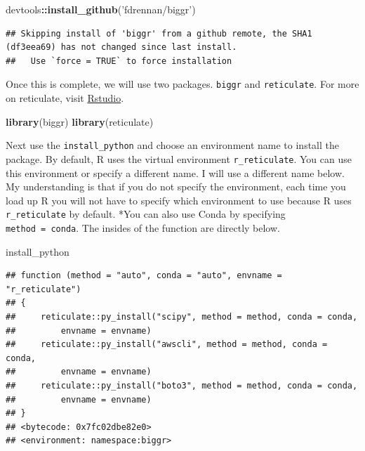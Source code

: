 \documentclass[]{book}
\newenvironment{Shaded}{\begin{snugshade}}{\end{snugshade}}
\newcommand{\KeywordTok}[1]{\textcolor[rgb]{0.13,0.29,0.53}{\textbf{#1}}}
\newcommand{\NormalTok}[1]{#1}
\newcommand{\OperatorTok}[1]{\textcolor[rgb]{0.81,0.36,0.00}{\textbf{#1}}}
\newcommand{\StringTok}[1]{\textcolor[rgb]{0.31,0.60,0.02}{#1}}
\begin{document}
\begin{Shaded}
\begin{Highlighting}[]
\NormalTok{devtools}\OperatorTok{::}\KeywordTok{install_github}\NormalTok{(}\StringTok{'fdrennan/biggr'}\NormalTok{)}
\end{Highlighting}
\end{Shaded}

\begin{verbatim}
## Skipping install of 'biggr' from a github remote, the SHA1 (df3eea69) has not changed since last install.
##   Use `force = TRUE` to force installation
\end{verbatim}

Once this is complete, we will use two packages. \texttt{biggr} and \texttt{reticulate}. For more on reticulate, visit \href{https://rstudio.github.io/reticulate/}{Rstudio}.

\begin{Shaded}
\begin{Highlighting}[]
\KeywordTok{library}\NormalTok{(biggr)}
\KeywordTok{library}\NormalTok{(reticulate)}
\end{Highlighting}
\end{Shaded}

Next use the \texttt{install\_python} and choose an environment name to install the package. By default, R uses the virtual environment \texttt{r\_reticulate}. You can use this environment or specify a different name. I will use a different name below. My understanding is that if you do not specify the environment, each time you load up R you will not have to specify which environment to use because R uses \texttt{r\_reticulate} by default. *You can also use Conda by specifying \texttt{method\ =\ conda}. The insides of the function are directly below.

\begin{Shaded}
\begin{Highlighting}[]
\NormalTok{install_python}
\end{Highlighting}
\end{Shaded}

\begin{verbatim}
## function (method = "auto", conda = "auto", envname = "r_reticulate") 
## {
##     reticulate::py_install("scipy", method = method, conda = conda, 
##         envname = envname)
##     reticulate::py_install("awscli", method = method, conda = conda, 
##         envname = envname)
##     reticulate::py_install("boto3", method = method, conda = conda, 
##         envname = envname)
## }
## <bytecode: 0x7fc02dbe82e0>
## <environment: namespace:biggr>
\end{verbatim}
\end{document}
